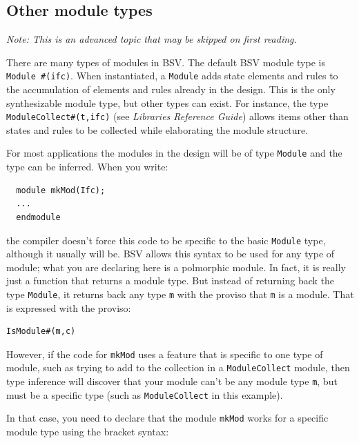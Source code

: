\documentclass[twoside,letterpaper]{article}
\newcommand{\LibRefGuide}{\emph{Libraries Reference Guide}}
\newcommand{\BSV}{BSV}
\newcommand{\bsc}{\emph{bsc}}
\newcommand{\te}[1]{\texttt{#1}}
\begin{document}


\subsection{Other module types}

\emph{Note: This is an advanced topic that may be skipped on first reading.}

There are many types of modules in {\BSV}.  The default {\BSV} module type
is \te{Module~\#(ifc)}.  When instantiated, a \te{Module} adds state
elements and rules to the accumulation of elements and rules already
in the design. This is the only synthesizable module type, but other
types can exist.  For instance, the type \te{ModuleCollect\#(t,ifc)}
(see \LibRefGuide) allows items other than states and rules to be
collected while elaborating the module structure.

For most applications  the modules in the design will be of type
\te{Module} and the type can be inferred.  When you write:

\begin{verbatim}
  module mkMod(Ifc);
  ...
  endmodule
\end{verbatim}
the compiler doesn't force this code to be specific to the basic
\te{Module} type, although it usually will be.  {\BSV} allows this syntax
to be used for any type of module; what you are declaring here is a
polmorphic module. In fact, it is really just a function that
returns a module type.  But instead of returning back the type
\te{Module}, it returns back any type \te{m} with the proviso that
\te{m} is a module.  That is expressed with the proviso:
\begin{verbatim}
IsModule#(m,c)
\end{verbatim}

However, if the code for \te{mkMod} uses a feature that is specific to
one type of module, such as trying to add to the collection in a
\te{ModuleCollect} module, then type inference will discover that your
module can't be any module type \te{m}, but must be a specific type
(such as \te{ModuleCollect} in this example).

In that case, you need to declare that the module \te{mkMod} works for
a specific module type using  the bracket syntax:
\end{document}
